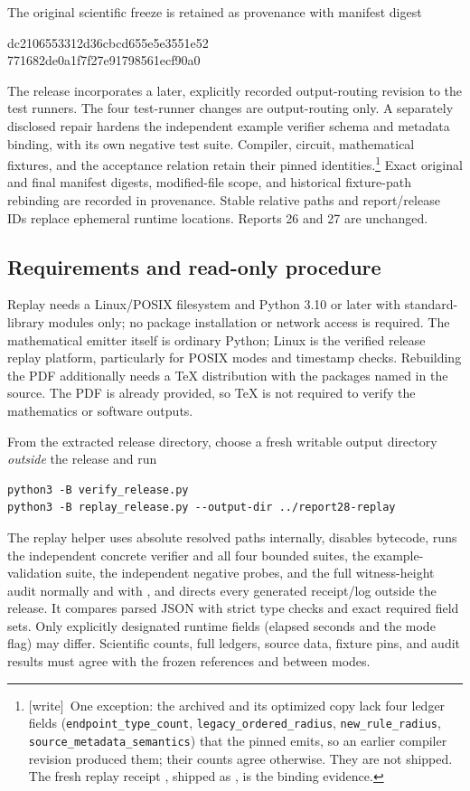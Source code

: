 \documentclass[11pt,a4paper]{article}
\numberwithin{equation}{section}
\newcommand{\file}[1]{\texttt{\detokenize{#1}}}
\newcommand{\wtag}{\textup{[write]}}
\begin{document}
The original scientific freeze is retained as provenance with manifest digest
\begin{center}\ttfamily\small
 dc2106553312d36cbcd655e5e3551e52\\
 771682de0a1f7f27e91798561ecf90a0
\end{center}
The release incorporates a later, explicitly recorded output-routing revision to the test runners. The four test-runner changes are output-routing only. A separately disclosed repair hardens the independent example verifier schema and metadata binding, with its own negative test suite. Compiler, circuit, mathematical fixtures, and the acceptance relation retain their pinned identities.\footnote{\wtag\ One exception: the archived  and its optimized copy lack four ledger fields (\texttt{endpoint\_type\_count}, \texttt{legacy\_ordered\_radius}, \texttt{new\_rule\_radius}, \texttt{source\_metadata\_semantics}) that the pinned  emits, so an earlier compiler revision produced them; their counts agree otherwise. They are not shipped. The fresh replay receipt , shipped as , is the binding evidence.} Exact original and final manifest digests, modified-file scope, and historical fixture-path rebinding are recorded in provenance. Stable relative paths and report/release IDs replace ephemeral runtime locations. Reports 26 and 27 are unchanged.

\subsection{Requirements and read-only procedure}
Replay needs a Linux/POSIX filesystem and Python 3.10 or later with standard-library modules only; no package installation or network access is required. The mathematical emitter itself is ordinary Python; Linux is the verified release replay platform, particularly for POSIX modes and timestamp checks. Rebuilding the PDF additionally needs a TeX distribution with the packages named in the source. The PDF is already provided, so TeX is not required to verify the mathematics or software outputs.

From the extracted release directory, choose a fresh writable output directory \emph{outside} the release and run
\begin{lstlisting}
python3 -B verify_release.py
python3 -B replay_release.py --output-dir ../report28-replay
\end{lstlisting}
The replay helper uses absolute resolved paths internally, disables bytecode, runs the independent concrete verifier and all four bounded suites, the example-validation suite, the independent negative probes, and the full witness-height audit normally and with \file{-O}, and directs every generated receipt/log outside the release. It compares parsed JSON with strict type checks and exact required field sets. Only explicitly designated runtime fields (elapsed seconds and the mode flag) may differ. Scientific counts, full ledgers, source data, fixture pins, and audit results must agree with the frozen references and between modes.
\end{document}
